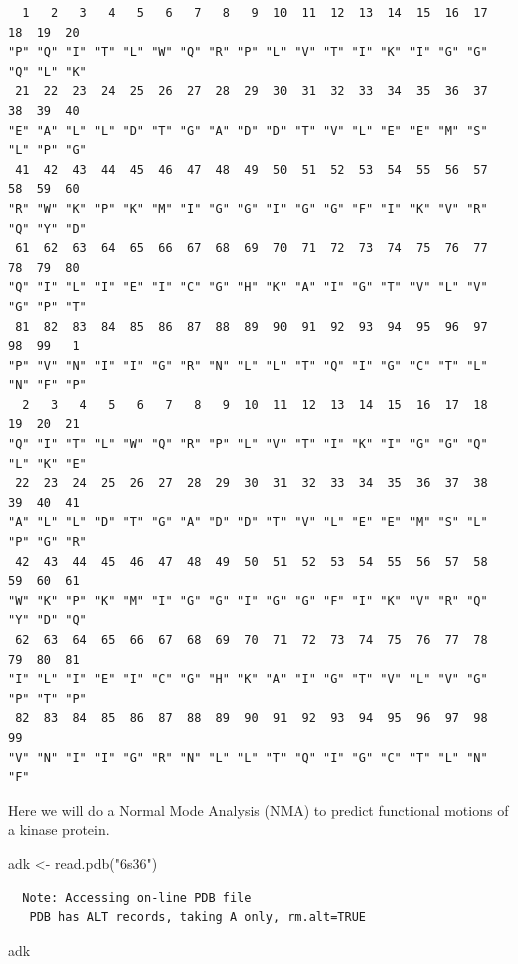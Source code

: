 \documentclass[
  letterpaper,
  DIV=11,
  numbers=noendperiod]{scrartcl}
\newenvironment{Shaded}{\begin{snugshade}}{\end{snugshade}}
\newcommand{\FunctionTok}[1]{\textcolor[rgb]{0.28,0.35,0.67}{#1}}
\newcommand{\NormalTok}[1]{\textcolor[rgb]{0.00,0.23,0.31}{#1}}
\newcommand{\OtherTok}[1]{\textcolor[rgb]{0.00,0.23,0.31}{#1}}
\newcommand{\StringTok}[1]{\textcolor[rgb]{0.13,0.47,0.30}{#1}}
\begin{document}
\begin{verbatim}
  1   2   3   4   5   6   7   8   9  10  11  12  13  14  15  16  17  18  19  20 
"P" "Q" "I" "T" "L" "W" "Q" "R" "P" "L" "V" "T" "I" "K" "I" "G" "G" "Q" "L" "K" 
 21  22  23  24  25  26  27  28  29  30  31  32  33  34  35  36  37  38  39  40 
"E" "A" "L" "L" "D" "T" "G" "A" "D" "D" "T" "V" "L" "E" "E" "M" "S" "L" "P" "G" 
 41  42  43  44  45  46  47  48  49  50  51  52  53  54  55  56  57  58  59  60 
"R" "W" "K" "P" "K" "M" "I" "G" "G" "I" "G" "G" "F" "I" "K" "V" "R" "Q" "Y" "D" 
 61  62  63  64  65  66  67  68  69  70  71  72  73  74  75  76  77  78  79  80 
"Q" "I" "L" "I" "E" "I" "C" "G" "H" "K" "A" "I" "G" "T" "V" "L" "V" "G" "P" "T" 
 81  82  83  84  85  86  87  88  89  90  91  92  93  94  95  96  97  98  99   1 
"P" "V" "N" "I" "I" "G" "R" "N" "L" "L" "T" "Q" "I" "G" "C" "T" "L" "N" "F" "P" 
  2   3   4   5   6   7   8   9  10  11  12  13  14  15  16  17  18  19  20  21 
"Q" "I" "T" "L" "W" "Q" "R" "P" "L" "V" "T" "I" "K" "I" "G" "G" "Q" "L" "K" "E" 
 22  23  24  25  26  27  28  29  30  31  32  33  34  35  36  37  38  39  40  41 
"A" "L" "L" "D" "T" "G" "A" "D" "D" "T" "V" "L" "E" "E" "M" "S" "L" "P" "G" "R" 
 42  43  44  45  46  47  48  49  50  51  52  53  54  55  56  57  58  59  60  61 
"W" "K" "P" "K" "M" "I" "G" "G" "I" "G" "G" "F" "I" "K" "V" "R" "Q" "Y" "D" "Q" 
 62  63  64  65  66  67  68  69  70  71  72  73  74  75  76  77  78  79  80  81 
"I" "L" "I" "E" "I" "C" "G" "H" "K" "A" "I" "G" "T" "V" "L" "V" "G" "P" "T" "P" 
 82  83  84  85  86  87  88  89  90  91  92  93  94  95  96  97  98  99 
"V" "N" "I" "I" "G" "R" "N" "L" "L" "T" "Q" "I" "G" "C" "T" "L" "N" "F" 
\end{verbatim}

Here we will do a Normal Mode Analysis (NMA) to predict functional
motions of a kinase protein.

\begin{Shaded}
\begin{Highlighting}[]
\NormalTok{adk }\OtherTok{\textless{}{-}} \FunctionTok{read.pdb}\NormalTok{(}\StringTok{"6s36"}\NormalTok{)}
\end{Highlighting}
\end{Shaded}

\begin{verbatim}
  Note: Accessing on-line PDB file
   PDB has ALT records, taking A only, rm.alt=TRUE
\end{verbatim}

\begin{Shaded}
\begin{Highlighting}[]
\NormalTok{adk}
\end{Highlighting}
\end{Shaded}
\end{document}
